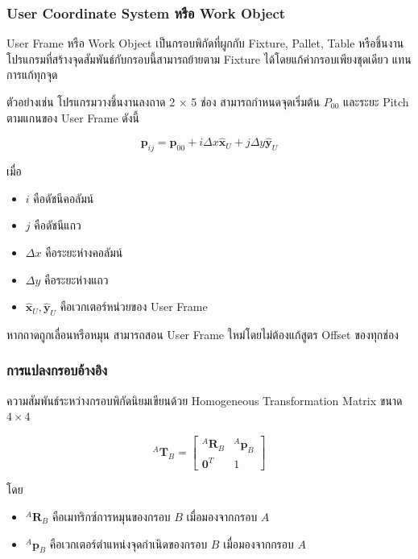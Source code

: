 \subsubsection{User Coordinate System หรือ Work Object}

User Frame หรือ Work Object เป็นกรอบพิกัดที่ผูกกับ Fixture, Pallet, Table หรือชิ้นงาน โปรแกรมที่สร้างจุดสัมพันธ์กับกรอบนี้สามารถย้ายตาม Fixture ได้โดยแก้ค่ากรอบเพียงชุดเดียว แทนการแก้ทุกจุด

ตัวอย่างเช่น โปรแกรมวางชิ้นงานลงถาด 2 × 5 ช่อง สามารถกำหนดจุดเริ่มต้น $P_{00}$ และระยะ Pitch ตามแกนของ User Frame ดังนี้

\[
\mathbf{p}_{ij}=\mathbf{p}_{00}+i\Delta x\hat{\mathbf{x}}_U+j\Delta y\hat{\mathbf{y}}_U
\]

เมื่อ

\begin{itemize}
    \item $i$ คือดัชนีคอลัมน์
    \item $j$ คือดัชนีแถว
    \item $\Delta x$ คือระยะห่างคอลัมน์
    \item $\Delta y$ คือระยะห่างแถว
    \item $\hat{\mathbf{x}}_U,\hat{\mathbf{y}}_U$ คือเวกเตอร์หน่วยของ User Frame
\end{itemize}

หากถาดถูกเลื่อนหรือหมุน สามารถสอน User Frame ใหม่โดยไม่ต้องแก้สูตร Offset ของทุกช่อง

\subsubsection{การแปลงกรอบอ้างอิง}

ความสัมพันธ์ระหว่างกรอบพิกัดนิยมเขียนด้วย Homogeneous Transformation Matrix ขนาด $4\times4$

\[
{}^{A}\mathbf{T}_{B}=
\begin{bmatrix}
{}^{A}\mathbf{R}_{B} & {}^{A}\mathbf{p}_{B}\\
\mathbf{0}^T & 1
\end{bmatrix}
\]

โดย

\begin{itemize}
    \item ${}^{A}\mathbf{R}_{B}$ คือเมทริกซ์การหมุนของกรอบ $B$ เมื่อมองจากกรอบ $A$
    \item ${}^{A}\mathbf{p}_{B}$ คือเวกเตอร์ตำแหน่งจุดกำเนิดของกรอบ $B$ เมื่อมองจากกรอบ $A$
\end{itemize}

